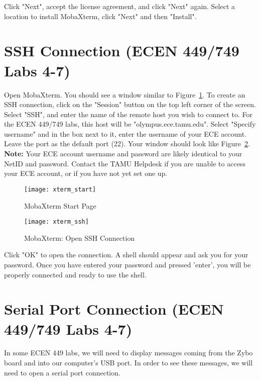 \documentclass[11pt,twoside,titlepage]{article}
\begin{document}
\noindent
Click "Next", accept the license agreement, and click "Next" again. Select a location to install MobaXterm, click "Next" and then "Install".\\




\section{SSH Connection (ECEN 449/749 Labs 4-7)}

\noindent Open MobaXterm. You should see a window similar to Figure~\ref{xterm_start}. To create an SSH connection, click on the "Session" button on the top left corner of the screen. Select "SSH", and enter the name of the remote host you wish to connect to. For the ECEN 449/749 labs, this host will be "olympus.ece.tamu.edu". Select "Specify username" and in the box next to it, enter the username of your ECE account. Leave the port as the default port (22). Your window should look like Figure~\ref{xterm_ssh}.\\

\noindent
\textbf{Note:} Your ECE account username and password are likely identical to your NetID and password. Contact the TAMU Helpdesk if you are unable to access your ECE account, or if you have not yet set one up.

\begin{figure}[!h]
	\centering 
	\texttt{[image: xterm\_start]}
	\caption{MobaXterm Start Page}
	\label{xterm_start}
\end{figure}

\begin{figure}[!h]
	\centering 
	\texttt{[image: xterm\_ssh]}
	\caption{MobaXterm: Open SSH Connection}
	\label{xterm_ssh}
\end{figure}

\noindent
Click "OK" to open the connection. A shell should appear and ask you for your password. Once you have entered your password and pressed 'enter', you will be properly connected and ready to use the shell.\


\section{Serial Port Connection (ECEN 449/749 Labs 4-7)}

\noindent
In some ECEN 449 labs, we will need to display messages coming from the Zybo board and into our computer's USB port. In order to see these messages, we will need to open a serial port connection.\\
\end{document}

